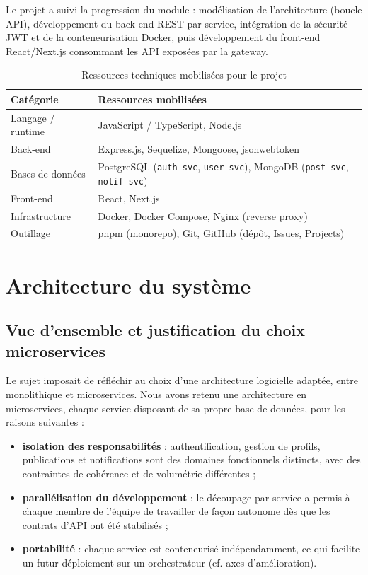 \documentclass{cesi}
\begin{document}
Le projet a suivi la progression du module : modélisation de l'architecture
(boucle API), développement du back-end REST par service, intégration de la
sécurité JWT et de la conteneurisation Docker, puis développement du front-end
React/Next.js consommant les API exposées par la gateway.

\begin{table}[H]
\centering
\begin{tabularx}{\linewidth}{l X}
\toprule
\textbf{Catégorie} & \textbf{Ressources mobilisées} \\
\midrule
Langage / runtime   & JavaScript / TypeScript, Node.js \\
Back-end            & Express.js, Sequelize, Mongoose, jsonwebtoken \\
Bases de données    & PostgreSQL (\texttt{auth-svc}, \texttt{user-svc}),
                       MongoDB (\texttt{post-svc}, \texttt{notif-svc}) \\
Front-end            & React, Next.js \\
Infrastructure       & Docker, Docker Compose, Nginx (reverse proxy) \\
Outillage            & pnpm (monorepo), Git, GitHub (dépôt, Issues, Projects) \\
\bottomrule
\end{tabularx}
\caption{Ressources techniques mobilisées pour le projet}
\end{table}

\newpage
\section{Architecture du système}

\subsection{Vue d'ensemble et justification du choix microservices}

Le sujet imposait de réfléchir au choix d'une architecture logicielle adaptée,
entre monolithique et microservices. Nous avons retenu une architecture en
microservices, chaque service disposant de sa propre base de données, 
pour les raisons suivantes :

\begin{itemize}
  \item \textbf{isolation des responsabilités} : authentification, gestion de profils,
        publications et notifications sont des domaines fonctionnels distincts, avec
        des contraintes de cohérence et de volumétrie différentes ;
  \item \textbf{parallélisation du développement} : le découpage par service a permis
        à chaque membre de l'équipe de travailler de façon autonome dès que les
        contrats d'API ont été stabilisés ;
  \item \textbf{portabilité} : chaque service est conteneurisé indépendamment, ce qui
        facilite un futur déploiement sur un orchestrateur (cf. axes d'amélioration).
\end{itemize}
\end{document}
